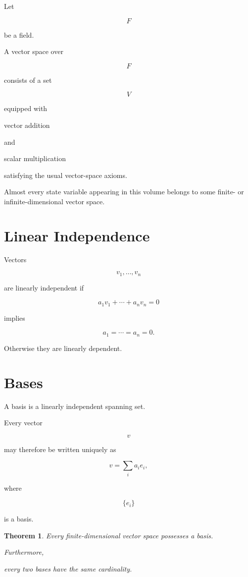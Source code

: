 \documentclass[11pt,fleqn]{book}
\numberwithin{equation}{chapter}
\theoremstyle{plain}
\newtheorem{theorem}{Theorem}[chapter]
\theoremstyle{definition}
\theoremstyle{remark}
\begin{document}
Let

\[
F
\]

be a field.

A vector space over

\[
F
\]

consists of a set

\[
V
\]

equipped with

vector addition

and

scalar multiplication

satisfying the usual vector-space axioms.

Almost every state variable appearing in this volume belongs to some
finite- or infinite-dimensional vector space.


\section{Linear Independence}

Vectors

\[
v_1,\ldots,v_n
\]

are linearly independent if

\[
a_1v_1+\cdots+a_nv_n=0
\]

implies

\[
a_1=\cdots=a_n=0.
\]

Otherwise they are linearly dependent.


\section{Bases}

A basis is a linearly independent spanning set.

Every vector

\[
v
\]

may therefore be written uniquely as

\[
v
=
\sum_i
a_ie_i,
\]

where

\[
\{e_i\}
\]

is a basis.


\begin{theorem}

Every finite-dimensional vector space possesses a basis.

Furthermore,

every two bases have the same cardinality.

\end{theorem}
\end{document}
